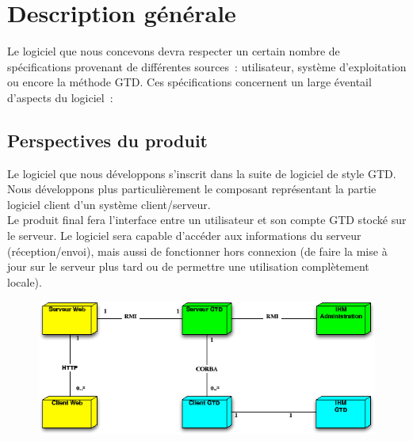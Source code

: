 \section{Description générale}

Le logiciel que nous concevons devra respecter un certain nombre de spé\-ci\-fi\-ca\-tions provenant de différentes sources~: utilisateur, système d'exploitation ou encore la méthode GTD. Ces spécifications concernent un large éventail d'aspects du logiciel~:


	\subsection{Perspectives du produit}

Le logiciel que nous développons s'inscrit dans la suite de logiciel de style GTD.
Nous développons plus particulièrement le composant représentant la partie logiciel client d'un système client/serveur.
\\
Le produit final fera l'interface entre un utilisateur et son compte GTD stocké sur le serveur. Le logiciel sera capable d'accéder aux informations du serveur (réception/envoi), mais aussi de fonctionner hors connexion (de faire la mise à jour sur le serveur plus tard ou de permettre une utilisation complètement locale).

\begin{figure}
\includegraphics[width=12cm]{images/projet-gtd001}
\end{figure}


